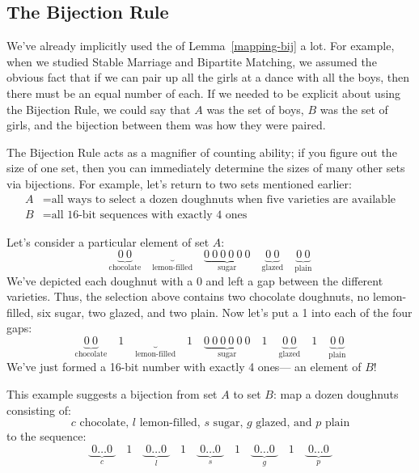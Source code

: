 
\subsection{The Bijection Rule}

We've already implicitly used the  of
Lemma~\ref{mapping-bij} a lot.  For example, when we studied Stable
Marriage and Bipartite Matching, we assumed the obvious fact that if we
can pair up all the girls at a dance with all the boys, then there must be
an equal number of each.  If we needed to be explicit about using the
Bijection Rule, we could say that $A$ was the set of boys, $B$ was the set
of girls, and the bijection between them was how they were paired.

The Bijection Rule acts as a magnifier of counting ability; if you
figure out the size of one set, then you can immediately determine the
sizes of many other sets via bijections.  For example, let's return to
two sets mentioned earlier:
%
\begin{align*}
A & = \text{all ways to select a dozen doughnuts when five varieties are available} \\
B & = \text{all 16-bit sequences with exactly 4 ones}
\end{align*}

Let's consider a particular element of set $A$:
%
\[
\underbrace{0\ 0}_{\text{chocolate}} \quad
\underbrace{}_{\text{lemon-filled}} \quad
\underbrace{0\ 0\ 0\ 0\ 0\ 0}_{\text{sugar}} \quad
\underbrace{0\ 0}_{\text{glazed}} \quad
\underbrace{0\ 0}_{\text{plain}}
\]
%
We've depicted each doughnut with a $0$ and left a gap between the
different varieties.  Thus, the selection above contains two chocolate
doughnuts, no lemon-filled, six sugar, two glazed, and two plain.  Now
let's put a 1 into each of the four gaps:
%
\[
\underbrace{0\ 0}_{\text{chocolate}} \quad 1 \quad
\underbrace{}_{\text{lemon-filled}} \quad 1 \quad
\underbrace{0\ 0\ 0\ 0\ 0\ 0}_{\text{sugar}} \quad 1 \quad
\underbrace{0\ 0}_{\text{glazed}} \quad 1 \quad
\underbrace{0\ 0}_{\text{plain}}
\]
%
We've just formed a 16-bit number with exactly 4 ones--- an element of
$B$!

This example suggests a bijection from set $A$ to set $B$: map a dozen
doughnuts consisting of:
%
\[
\text{$c$ chocolate, $l$ lemon-filled, $s$ sugar, $g$ glazed, and $p$ plain}
\]
%
to the sequence:
%
\[
\underbrace{\ 0 \ldots 0\ }_{\text{$c$}} \quad 1 \quad
\underbrace{\ 0 \ldots 0\ }_{\text{$l$}} \quad 1 \quad
\underbrace{\ 0 \ldots 0\ }_{\text{$s$}} \quad 1 \quad
\underbrace{\ 0 \ldots 0\ }_{\text{$g$}} \quad 1 \quad
\underbrace{\ 0 \ldots 0\ }_{\text{$p$}}
\]

